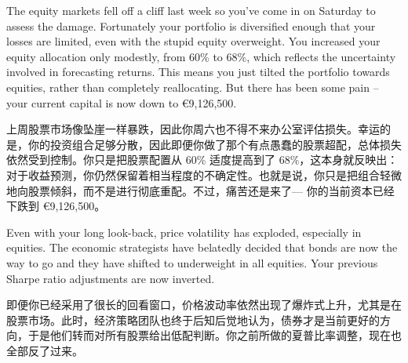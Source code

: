\begin{englishblock} The equity markets fell off a cliff last week so you've come in on Saturday to assess the damage. Fortunately your portfolio is diversified enough that your losses are limited, even with the stupid equity overweight. You increased your equity allocation only modestly, from 60\% to 68\%, which reflects the uncertainty involved in forecasting returns. This means you just tilted the portfolio towards equities, rather than completely reallocating. But there has been some pain -- your current capital is now down to €9,126,500. \end{englishblock}

\begin{chineseblock}上周股票市场像坠崖一样暴跌，因此你周六也不得不来办公室评估损失。幸运的是，你的投资组合足够分散，因此即便你做了那个有点愚蠢的股票超配，总体损失依然受到控制。你只是把股票配置从 60\% 适度提高到了 68\%，这本身就反映出：对于收益预测，你仍然保留着相当程度的不确定性。也就是说，你只是把组合轻微地向股票倾斜，而不是进行彻底重配。不过，痛苦还是来了--- 你的当前资本已经下跌到 €9,126,500。 \end{chineseblock}

\bipairgap

\begin{englishblock} Even with your long look-back, price volatility has exploded, especially in equities. The economic strategists have belatedly decided that bonds are now the way to go and they have shifted to underweight in all equities. Your previous Sharpe ratio adjustments are now inverted. \end{englishblock}

\begin{chineseblock}即便你已经采用了很长的回看窗口，价格波动率依然出现了爆炸式上升，尤其是在股票市场。此时，经济策略团队也终于后知后觉地认为，债券才是当前更好的方向，于是他们转而对所有股票给出低配判断。你之前所做的夏普比率调整，现在也全部反了过来。\end{chineseblock}


